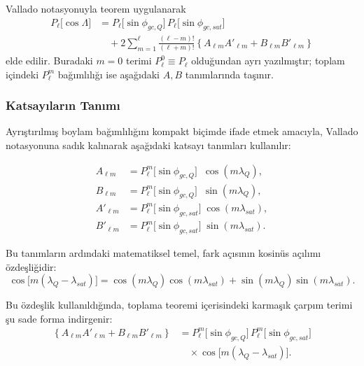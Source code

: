 \medskip
\noindent
Vallado notasyonuyla teorem uygulanarak
\begin{equation}
\label{eq:addition_theorem_vallado_form}
\begin{split}
P_{\ell}\!\bigl[\cos\Lambda\bigr] &=
P_{\ell}\!\bigl[\sin\phi_{gc,Q}\bigr]\,
P_{\ell}\!\bigl[\sin\phi_{gc,sat}\bigr] \\
&\quad +
2\sum_{m=1}^{\ell}
\frac{(\ell-m)!}{(\ell+m)!}
\left\{
A_{\ell m}A'_{\ell m}+B_{\ell m}B'_{\ell m}
\right\}
\end{split}
\end{equation}
elde edilir. Buradaki $m=0$ terimi $P_\ell^0\equiv P_\ell$ olduğundan ayrı yazılmıştır; toplam içindeki $P_\ell^m$ bağımlılığı ise aşağıdaki $A,B$ tanımlarında taşınır.

\subsubsection{Katsayıların Tanımı}

Ayrıştırılmış boylam bağımlılığını kompakt biçimde ifade etmek amacıyla, Vallado notasyonuna sadık kalınarak aşağıdaki katsayı tanımları kullanılır:

\begin{align}
A_{\ell m}  &= P_{\ell}^{m}\!\bigl[\sin\phi_{gc,Q}\bigr] \;\; \cos(m\lambda_Q),
\label{eq:Alm_def_vallado} \\[4pt]
B_{\ell m}  &= P_{\ell}^{m}\!\bigl[\sin\phi_{gc,Q}\bigr] \;\; \sin(m\lambda_Q),
\label{eq:Blm_def_vallado} \\[10pt] %
A'_{\ell m} &= P_{\ell}^{m}\!\bigl[\sin\phi_{gc,sat}\bigr] \; \cos(m\lambda_{sat}),
\label{eq:Almprime_def_vallado} \\[4pt]
B'_{\ell m} &= P_{\ell}^{m}\!\bigl[\sin\phi_{gc,sat}\bigr] \; \sin(m\lambda_{sat}).
\label{eq:Blmprime_def_vallado}
\end{align}

Bu tanımların ardındaki matematiksel temel, fark açısının kosinüs açılımı özdeşliğidir:
\begin{equation}
\cos\!\bigl[m(\lambda_Q-\lambda_{sat})\bigr]
=
\cos(m\lambda_Q)\cos(m\lambda_{sat})
+
\sin(m\lambda_Q)\sin(m\lambda_{sat}).
\label{eq:cos_m_delta_lambda_identity}
\end{equation}

Bu özdeşlik kullanıldığında, toplama teoremi içerisindeki karmaşık çarpım terimi şu sade forma indirgenir:
\begin{equation*}
\begin{split}
\left\{ A_{\ell m}A'_{\ell m} + B_{\ell m}B'_{\ell m} \right\}
&=
P_{\ell}^{m}\!\bigl[\sin\phi_{gc,Q}\bigr] \,
P_{\ell}^{m}\!\bigl[\sin\phi_{gc,sat}\bigr] \\
&\quad \times
\cos\!\bigl[m(\lambda_Q-\lambda_{sat})\bigr].
\end{split}
\end{equation*}


